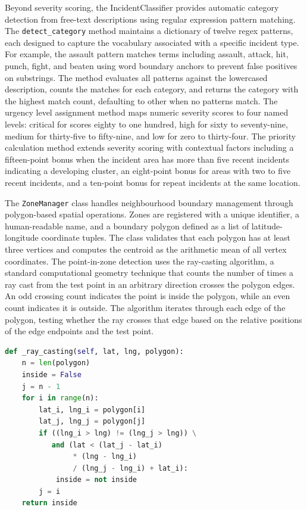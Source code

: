 \documentclass[conference]{IEEEtran}
\begin{document}
Beyond severity scoring, the IncidentClassifier provides automatic category detection from free-text descriptions using regular expression pattern matching. The \texttt{detect\_category} method maintains a dictionary of twelve regex patterns, each designed to capture the vocabulary associated with a specific incident type. For example, the assault pattern matches terms including assault, attack, hit, punch, fight, and beaten using word boundary anchors to prevent false positives on substrings. The method evaluates all patterns against the lowercased description, counts the matches for each category, and returns the category with the highest match count, defaulting to other when no patterns match. The urgency level assignment method maps numeric severity scores to four named levels: critical for scores eighty to one hundred, high for sixty to seventy-nine, medium for thirty-five to fifty-nine, and low for zero to thirty-four. The priority calculation method extends severity scoring with contextual factors including a fifteen-point bonus when the incident area has more than five recent incidents indicating a developing cluster, an eight-point bonus for areas with two to five recent incidents, and a ten-point bonus for repeat incidents at the same location.

The \texttt{ZoneManager} class handles neighbourhood boundary management through polygon-based spatial operations. Zones are registered with a unique identifier, a human-readable name, and a boundary polygon defined as a list of latitude-longitude coordinate tuples. The class validates that each polygon has at least three vertices and computes the centroid as the arithmetic mean of all vertex coordinates. The point-in-zone detection uses the ray-casting algorithm, a standard computational geometry technique that counts the number of times a ray cast from the test point in an arbitrary direction crosses the polygon edges. An odd crossing count indicates the point is inside the polygon, while an even count indicates it is outside. The algorithm iterates through each edge of the polygon, testing whether the ray crosses that edge based on the relative positions of the edge endpoints and the test point.

\begin{lstlisting}[language=Python, caption=ZoneManager ray-casting point-in-polygon]
def _ray_casting(self, lat, lng, polygon):
    n = len(polygon)
    inside = False
    j = n - 1
    for i in range(n):
        lat_i, lng_i = polygon[i]
        lat_j, lng_j = polygon[j]
        if ((lng_i > lng) != (lng_j > lng)) \
           and (lat < (lat_j - lat_i)
                * (lng - lng_i)
                / (lng_j - lng_i) + lat_i):
            inside = not inside
        j = i
    return inside
\end{lstlisting}
\end{document}
